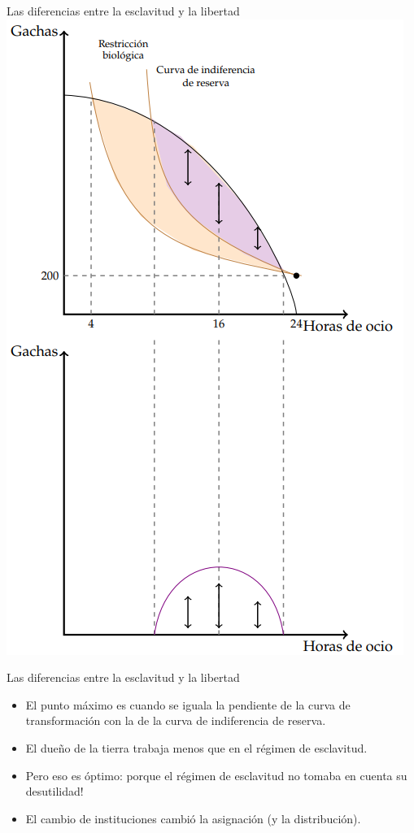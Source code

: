 \documentclass{beamer}
\begin{document}
\begin{frame}{Las diferencias entre la esclavitud y la libertad}
    \centering
    \includegraphics[scale=0.5]{../Figures/C19.11.png}
\end{frame}


\begin{frame}{Las diferencias entre la esclavitud y la libertad}
    \begin{itemize}
        \begin{boxA}
            \centering
            En el óptimo, el trabajador elegirá el nivel de trabajo donde el costo marginal iguala a la producción marginal, que es el punto en el que se maximiza la diferencia entre estas dos curvas.
        \end{boxA}
        \item El punto máximo es cuando se iguala la pendiente de la curva de transformación con la de la curva de indiferencia de reserva. 
        \item El dueño de la tierra trabaja menos que en el régimen de esclavitud.
        \item Pero eso es óptimo: porque el régimen de esclavitud no tomaba en cuenta su desutilidad!
        \item El cambio de instituciones cambió la asignación (y la distribución).
    \end{itemize}
\end{frame}
\end{document}

